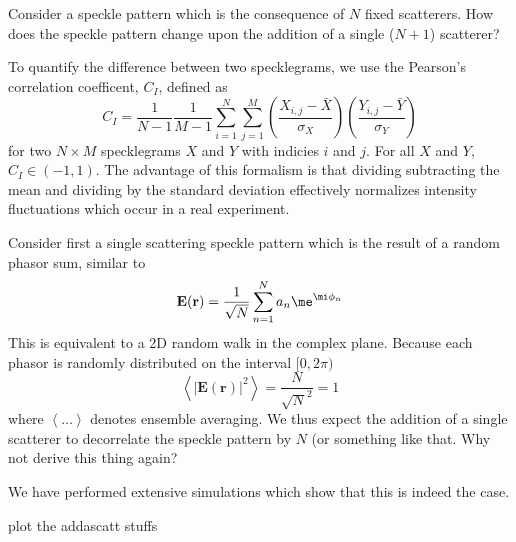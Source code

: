 Consider a speckle pattern which is the consequence of $N$ fixed
scatterers.  How does the speckle pattern change upon the addition of a
single ($N+1$) scatterer?  



To quantify the difference between two specklegrams, we use the Pearson's
correlation coefficent, $C_I$, defined as 
\begin{equation}
C_I = \frac{1}{N-1} \frac{1}{M-1} 
\sum_{i=1}^N \sum_{j=1}^M 
\left(\frac{X_{i,j} - \bar{X}}{\sigma_X}\right)
\left(\frac{Y_{i,j} - \bar{Y}}{\sigma_Y}\right)
\end{equation}
for two $N \times M$ specklegrams $X$ and $Y$ with indicies $i$ and $j$.
For all $X$ and $Y$, $C_I \in (-1,1)$.
The advantage of this formalism is that dividing subtracting the mean and
dividing by the standard deviation effectively normalizes intensity
fluctuations which occur in a real experiment.

Consider first a single scattering speckle pattern which is the result of a
random phasor sum, similar to 
\begin{equation}
\mathbf{E}(\mathbf{r}) = \frac{1}{\sqrt{N}} \sum_{n=1}^{N} a_n \me^{\mi \phi_n}
\end{equation}
This is equivalent to a 2D random walk in the complex plane.  Because each
phasor is randomly distributed on the interval $[0,2\pi)$
\begin{equation}
\left<|\mathbf{E}(\mathbf{r})|^2\right> = \frac{N}{\sqrt{N}^2} = 1
\end{equation}
where $\left<\dots\right>$ denotes ensemble averaging.  We thus expect the
addition of a single scatterer to decorrelate the speckle pattern by $N$
(or something like that.  Why not derive this thing again?

We have performed extensive simulations which show that this is indeed the
case.

plot the addascatt stuffs
